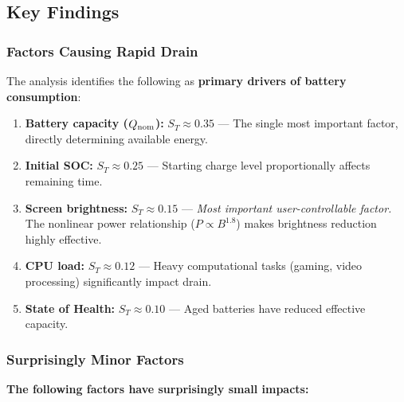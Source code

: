 \subsection{Key Findings}
\label{subsec:findings}

\subsubsection{Factors Causing Rapid Drain}

The analysis identifies the following as \textbf{primary drivers of battery consumption}:

\begin{enumerate}
    \item \textbf{Battery capacity ($Q_{\text{nom}}$):} $S_T \approx 0.35$ --- The single most important factor, directly determining available energy.
    
    \item \textbf{Initial SOC:} $S_T \approx 0.25$ --- Starting charge level proportionally affects remaining time.
    
    \item \textbf{Screen brightness:} $S_T \approx 0.15$ --- \textit{Most important user-controllable factor.} The nonlinear power relationship ($P \propto B^{1.8}$) makes brightness reduction highly effective.
    
    \item \textbf{CPU load:} $S_T \approx 0.12$ --- Heavy computational tasks (gaming, video processing) significantly impact drain.
    
    \item \textbf{State of Health:} $S_T \approx 0.10$ --- Aged batteries have reduced effective capacity.
\end{enumerate}

\subsubsection{Surprisingly Minor Factors}

\textbf{The following factors have surprisingly small impacts:}

